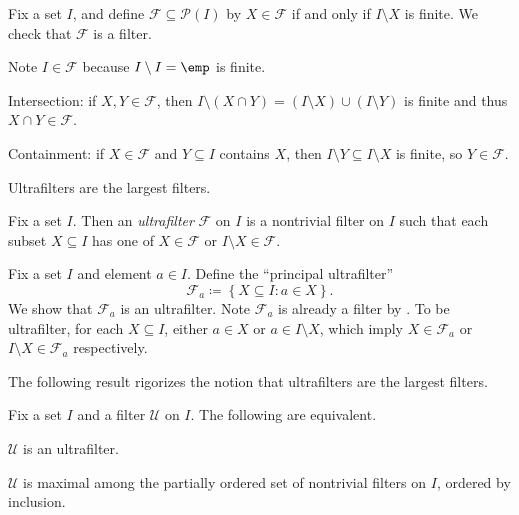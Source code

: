 \documentclass[../notes.tex]{subfiles}
\begin{document}
\begin{example}
	Fix a set $I$, and define $\mathcal F\subseteq\mathcal P(I)$ by $X\in\mathcal F$ if and only if $I\setminus X$ is finite. We check that $\mathcal F$ is a filter.
	\begin{listalph}
		\item Note $I\in\mathcal F$ because $I\setminus I=\emp$ is finite.
		\item Intersection: if $X,Y\in\mathcal F$, then $I\setminus(X\cap Y)=(I\setminus X)\cup(I\setminus Y)$ is finite and thus $X\cap Y\in\mathcal F$.
		\item Containment: if $X\in\mathcal F$ and $Y\subseteq I$ contains $X$, then $I\setminus Y\subseteq I\setminus X$ is finite, so $Y\in\mathcal F$.
	\end{listalph}
\end{example}
Ultrafilters are the largest filters.
\begin{definition}[ultrafilter]
	Fix a set $I$. Then an \textit{ultrafilter} $\mathcal F$ on $I$ is a nontrivial filter on $I$ such that each subset $X\subseteq I$ has one of $X\in\mathcal F$ or $I\setminus X\in\mathcal F$.
\end{definition}
\begin{example}
	Fix a set $I$ and element $a\in I$. Define the ``principal ultrafilter''
	\[\mathcal F_a\coloneqq\left\{X\subseteq I:a\in X\right\}.\]
	We show that $\mathcal F_a$ is an ultrafilter. Note $\mathcal F_a$ is already a filter by . To be ultrafilter, for each $X\subseteq I$, either $a\in X$ or $a\in I\setminus X$, which imply $X\in\mathcal F_a$ or $I\setminus X\in\mathcal F_a$ respectively.
\end{example}
The following result rigorizes the notion that ultrafilters are the largest filters.
\begin{lemma} \label{lem:ultrafilter-is-maximal}
	Fix a set $I$ and a filter $\mathcal U$ on $I$. The following are equivalent.
	\begin{listalph}
		\item $\mathcal U$ is an ultrafilter.
		\item $\mathcal U$ is maximal among the partially ordered set of nontrivial filters on $I$, ordered by inclusion.
	\end{listalph}
\end{lemma}
\end{document}
